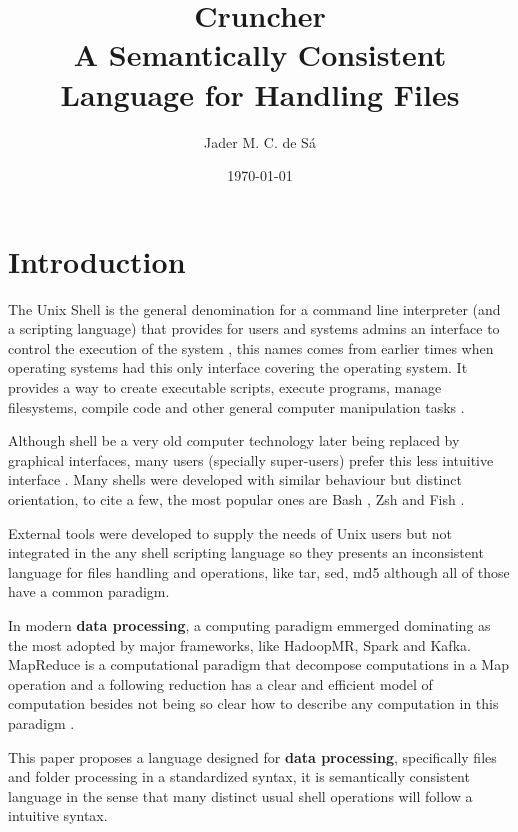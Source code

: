 \documentclass{article}
\title{Cruncher\\
\large A Semantically Consistent Language for Handling Files}
\author{Jader M. C. de Sá}
\date{\today}
\begin{document}
\maketitle

\section{Introduction}



The Unix Shell is the general denomination for a command line interpreter
(and a scripting language) that provides for users and systems admins an
interface to control the execution of the system \cite{negus2010linux},
this names comes from earlier times when operating systems had this only
interface covering the operating system. It provides a way to create
executable scripts, execute programs, manage filesystems, compile code and
other general computer manipulation tasks \cite{negus2010linux,blum2008linux}.

Although shell be a very old computer technology later being replaced by
graphical interfaces, many users (specially super-users) prefer this less
intuitive interface \cite{negus2010linux,newham2005learning}. Many shells were
developed with similar behaviour but distinct orientation, to cite a few, the
most popular ones are Bash \cite{bash}, Zsh \cite{zsh} and Fish \cite{fish}.

External tools were developed to supply the needs of Unix users
but not integrated in the any shell scripting language so they presents an
inconsistent language for files handling and operations, like tar, sed, md5
although all of those have a common paradigm.

In modern \textbf{data processing}, a computing paradigm emmerged dominating
as the most adopted by major frameworks, like HadoopMR, Spark and Kafka.
MapReduce is a computational paradigm that decompose computations in a
Map operation and a following reduction has a clear and efficient model of
computation besides not being so clear how to describe any computation in
this paradigm \cite{afrati2012vision}.

This paper proposes a language designed for \textbf{data processing},
specifically files and folder processing in a standardized syntax, it is
semantically consistent language in the sense that many distinct usual shell
operations will follow a intuitive syntax.
\end{document}
